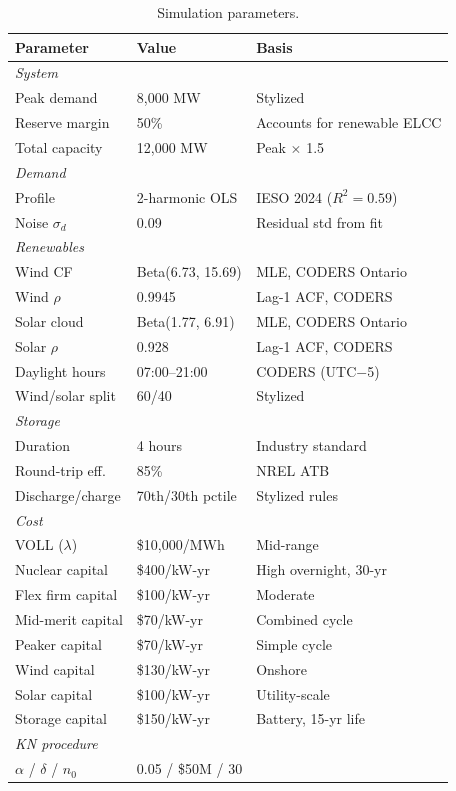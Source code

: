 \documentclass[11pt]{article}
\begin{document}
\begin{table}[H]
\centering
\caption{Simulation parameters.}\label{tab:params}
\small
\begin{tabular}{lll}
\toprule
Parameter & Value & Basis \\
\midrule
\multicolumn{3}{l}{\textit{System}} \\
Peak demand & 8,000 MW & Stylized \\
Reserve margin & 50\% & Accounts for renewable ELCC \\
Total capacity & 12,000 MW & Peak $\times$ 1.5 \\
\midrule
\multicolumn{3}{l}{\textit{Demand}} \\
Profile & 2-harmonic OLS & IESO 2024 ($R^2 = 0.59$) \\
Noise $\sigma_d$ & 0.09 & Residual std from fit \\
\midrule
\multicolumn{3}{l}{\textit{Renewables}} \\
Wind CF & Beta(6.73, 15.69) & MLE, CODERS Ontario \\
Wind $\rho$ & 0.9945 & Lag-1 ACF, CODERS \\
Solar cloud & Beta(1.77, 6.91) & MLE, CODERS Ontario \\
Solar $\rho$ & 0.928 & Lag-1 ACF, CODERS \\
Daylight hours & 07:00--21:00 & CODERS (UTC$-$5) \\
Wind/solar split & 60/40 & Stylized \\
\midrule
\multicolumn{3}{l}{\textit{Storage}} \\
Duration & 4 hours & Industry standard \\
Round-trip eff.\ & 85\% & NREL ATB \\
Discharge/charge & 70th/30th pctile & Stylized rules \\
\midrule
\multicolumn{3}{l}{\textit{Cost}} \\
VOLL ($\lambda$) & \$10,000/MWh & Mid-range \\
Nuclear capital & \$400/kW-yr & High overnight, 30-yr \\
Flex firm capital & \$100/kW-yr & Moderate \\
Mid-merit capital & \$70/kW-yr & Combined cycle \\
Peaker capital & \$70/kW-yr & Simple cycle \\
Wind capital & \$130/kW-yr & Onshore \\
Solar capital & \$100/kW-yr & Utility-scale \\
Storage capital & \$150/kW-yr & Battery, 15-yr life \\
\midrule
\multicolumn{3}{l}{\textit{KN procedure}} \\
$\alpha$ / $\delta$ / $n_0$ & 0.05 / \$50M / 30 & \\
\bottomrule
\end{tabular}
\end{table}
\end{document}
